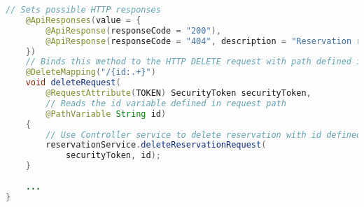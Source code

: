\begin{lstlisting}[language=java, caption=ReservationRequestController.java, label=lst:controller]
    // Sets possible HTTP responses
    @ApiResponses(value = {
        @ApiResponse(responseCode = "200"),
        @ApiResponse(responseCode = "404", description = "Reservation request not found.", content = @Content),
    })
    // Binds this method to the HTTP DELETE request with path defined in @RequestMapping concatenated with "/{id:.+}". The ':' marks the start of a regex to be used for the id variable (useful to accept only numbers for example). The regex ".+" is used because shongo-id can include URL key characters like ':' or '-'.
    @DeleteMapping("/{id:.+}")
    void deleteRequest(
        @RequestAttribute(TOKEN) SecurityToken securityToken,
        // Reads the id variable defined in request path
        @PathVariable String id)
    {
        // Use Controller service to delete reservation with id defined in path
        reservationService.deleteReservationRequest(
            securityToken, id);
    }
    
    ...
}
\end{lstlisting}